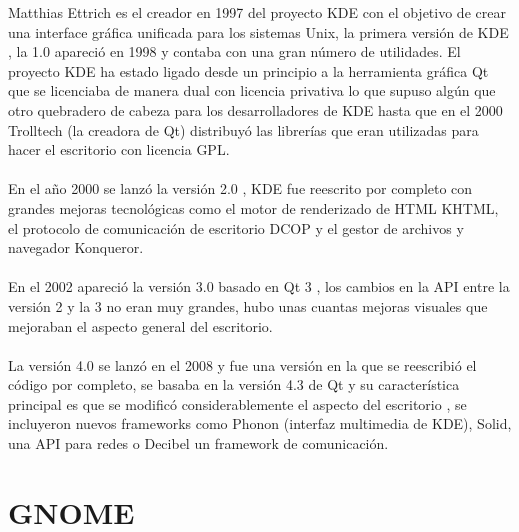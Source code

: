 \documentclass[a4paper,oneside,11pt]{article}
\begin{document}
Matthias Ettrich es el creador en 1997 del proyecto KDE con el objetivo de crear una interface gr\'afica 
unificada para los sistemas Unix, la primera versi\'on de KDE , la 1.0 apareci\'o en 1998 y contaba con
una gran n\'umero de utilidades. El proyecto KDE ha estado ligado desde un principio a la herramienta
gr\'afica Qt que se licenciaba de manera dual con licencia privativa lo que supuso alg\'un que otro
quebradero de cabeza para los desarrolladores de KDE hasta que en el 2000 Trolltech (la creadora de Qt) 
distribuy\'o las librer\'ias que eran utilizadas para hacer el escritorio con licencia GPL.
\\\\
En el año 2000 se lanz\'o la versi\'on 2.0 , KDE fue reescrito por completo con grandes mejoras tecnol\'ogicas
como el motor de renderizado de HTML KHTML, el protocolo de comunicaci\'on de escritorio DCOP y el gestor de archivos
y navegador Konqueror.
\\\\
En el 2002 apareci\'o la versi\'on 3.0 basado en Qt 3 , los cambios en la API entre la versi\'on 2 y la 3
no eran muy grandes, hubo unas cuantas mejoras visuales que mejoraban el aspecto general del escritorio.
\\\\
La versi\'on 4.0 se lanz\'o en el 2008 y fue una versi\'on en la que se reescribi\'o el c\'odigo por completo,
se basaba en la versi\'on 4.3 de Qt y su caracter\'istica principal es que se modific\'o considerablemente el
aspecto del escritorio , se incluyeron nuevos frameworks como Phonon (interfaz multimedia de KDE), Solid, una
API para redes o Decibel un framework de comunicaci\'on.

\section{GNOME}
\end{document}

